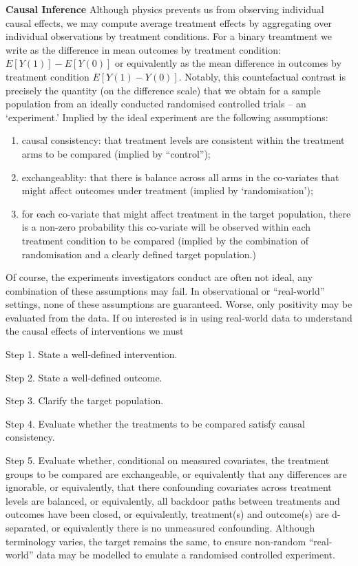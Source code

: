 \documentclass[
  single column]{article}
\providecommand{\tightlist}{%
  \setlength{\itemsep}{0pt}\setlength{\parskip}{0pt}}\usepackage{longtable,booktabs,array}
\begin{document}
\textbf{Causal Inference} Although physics prevents us from observing
individual causal effects, we may compute average treatment effects by
aggregating over individual observations by treatment conditions. For a
binary treamtment we write as the difference in mean outcomes by
treatment condition: \(E[Y(1)] - E[Y(0)]\) or equivalently as the mean
difference in outcomes by treatment condition \(E[Y(1) - Y(0)]\).
Notably, this countefactual contrast is precisely the quantity (on the
difference scale) that we obtain for a sample population from an ideally
conducted randomised controlled trials -- an `experiment.' Implied by
the ideal experiment are the following assumptions:

\begin{enumerate}
\def\labelenumi{(\arabic{enumi})}
\tightlist
\item
  causal consistency: that treatment levels are consistent within the
  treatment arms to be compared (implied by ``control'');
\item
  exchangeablity: that there is balance across all arms in the
  co-variates that might affect outcomes under treatment (implied by
  `randomisation');
\item
  for each co-variate that might affect treatment in the target
  population, there is a non-zero probability this co-variate will be
  observed within each treatment condition to be compared (implied by
  the combination of randomisation and a clearly defined target
  population.)
\end{enumerate}

Of course, the experiments investigators conduct are often not ideal,
any combination of these assumptions may fail. In observational or
``real-world'' settings, none of these assumptions are guaranteed.
Worse, only positivity may be evaluated from the data. If ou interested
is in using real-world data to understand the causal effects of
interventions we must

Step 1. State a well-defined intervention.

Step 2. State a well-defined outcome.

Step 3. Clarify the target population.

Step 4. Evaluate whether the treatments to be compared satisfy causal
consistency.

Step 5. Evaluate whether, conditional on measured covariates, the
treatment groups to be compared are exchangeable, or equivalently that
any differences are ignorable, or equivalently, that there confounding
covariates across treatment levels are balanced, or equivalently, all
backdoor paths between treatments and outcomes have been closed, or
equivalently, treatment(s) and outcome(s) are d-separated, or
equivalently there is no unmeasured confounding. Although terminology
varies, the target remains the same, to ensure non-random ``real-world''
data may be modelled to emulate a randomised controlled experiment.
\end{document}
